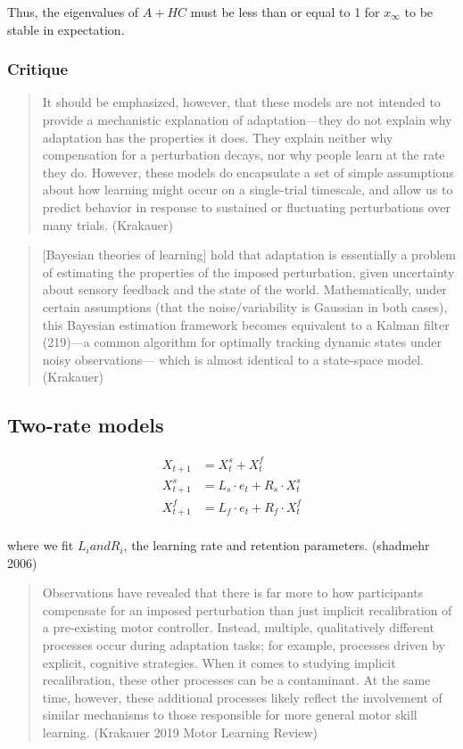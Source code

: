 Thus, the eigenvalues of \(A + HC\) must be less than or equal to 1 for
\(x_\infty\) to be stable in expectation.

\subsubsection{Critique}\label{critique}

\begin{quote}
It should be emphasized, however, that these models are not intended to
provide a mechanistic explanation of adaptation---they do not explain
why adaptation has the properties it does. They explain neither why
compensation for a perturbation decays, nor why people learn at the rate
they do. However, these models do encapsulate a set of simple
assumptions about how learning might occur on a single-trial timescale,
and allow us to predict behavior in response to sustained or fluctuating
perturbations over many trials. (Krakauer)
\end{quote}

\begin{quote}
{[}Bayesian theories of learning{]} hold that adaptation is essentially
a problem of estimating the properties of the imposed perturbation,
given uncertainty about sensory feedback and the state of the world.
Mathematically, under certain assumptions (that the noise/variability is
Gaussian in both cases), this Bayesian estimation framework becomes
equivalent to a Kalman filter (219)---a common algorithm for optimally
tracking dynamic states under noisy observations--- which is almost
identical to a state-space model. (Krakauer)
\end{quote}

\subsection{Two-rate models}\label{two-rate-models}

\[
\begin{aligned}
X_{t+1} &= X^{s}_{t} + X^f_t \\
X^s_{t+1} &= L_s \cdot e_t + R_s \cdot X^s_{t} \\
X^f_{t+1} &= L_f \cdot e_t + R_f \cdot X^f_{t} \\
\end{aligned}
\]

where we fit \(L_i and R_i\), the learning rate and retention
parameters. (shadmehr 2006)

\begin{quote}
Observations have revealed that there is far more to how participants
compensate for an imposed perturbation than just implicit recalibration
of a pre-existing motor controller. Instead, multiple, qualitatively
different processes occur during adaptation tasks; for example,
processes driven by explicit, cognitive strategies. When it comes to
studying implicit recalibration, these other processes can be a
contaminant. At the same time, however, these additional processes
likely reflect the involvement of similar mechanisms to those
responsible for more general motor skill learning. (Krakauer 2019 Motor
Learning Review)
\end{quote}

